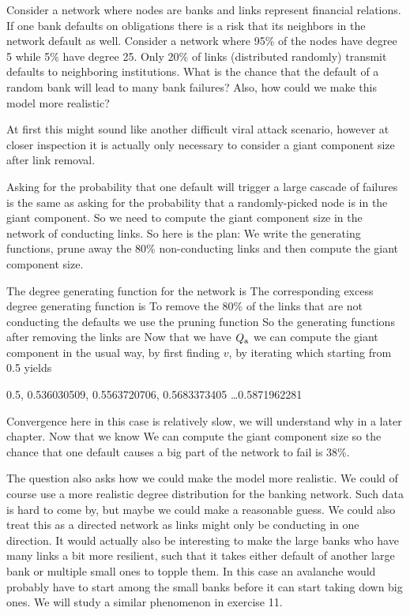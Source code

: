 
\label{exAttackBank}Consider a network where nodes are banks and links represent financial relations. If one bank defaults on obligations there is a risk that its neighbors in the network default as well. Consider a network where 95\% of the nodes have degree 5 while 5\% have degree 25. Only 20\% of links (distributed randomly) transmit defaults to neighboring institutions. What is the chance that the default of a random bank will lead to many bank failures? Also, how could we make this model more realistic?

\solution
At first this might sound like another difficult viral attack scenario, however at closer inspection it is actually only necessary to consider a giant component size after link removal. 

Asking for the probability that one default will trigger a large cascade of failures is the same as asking for the probability that a randomly-picked node is in the giant component. So we need to compute the giant component size in the network of conducting links. So here is the plan: We write the generating functions, prune away the 80\% non-conducting links and then compute the giant component size. 

The degree generating function for the network is 
The corresponding excess degree generating function is 
To remove the 80\% of the links that are not conducting the defaults we 
use the pruning function 
So the generating functions after removing the links are 
Now that we have $Q_{\rm a}$ we can compute the giant component in the usual way, by first finding $v$, by iterating
which starting from 0.5 yields
\begin{center}
    0.5, 0.536030509, 0.5563720706, 0.5683373405  \ldots 0.5871962281
\end{center}
Convergence here in this case is relatively slow, we will understand why in a later chapter. Now that we know 
We can compute the giant component size
so the chance that one default causes a big part of the network to fail is 38\%. 

The question also asks how we could make the model more realistic. We could of course use a more realistic degree distribution for the banking network. Such data is hard to come by, but maybe we could make a reasonable guess. We could also treat this as a directed network as links might only be conducting in one direction. It would actually also be interesting to make the large banks who have many links a bit more resilient, such that it takes either default of another large bank or multiple small ones to topple them. In this case an avalanche would probably have to start among the small banks before it can start taking down big ones. We will study a similar phenomenon in exercise 11.  